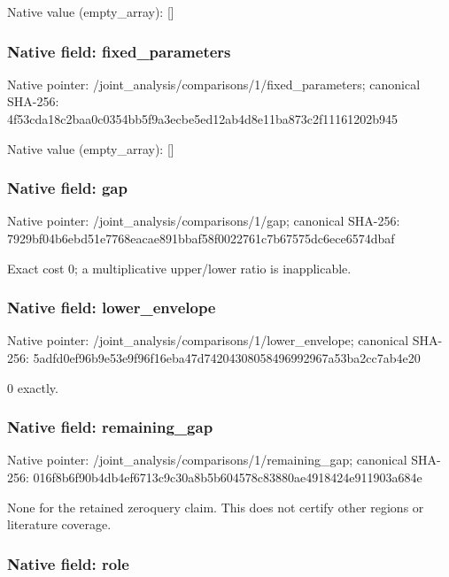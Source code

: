 \documentclass[10pt,a4paper]{article}
\begin{document}
Native value (empty\_array): []



\subsubsection{Native field: fixed\_parameters}


Native pointer: /joint\_analysis/comparis\allowbreak{}ons/1/fixed\_parameters; canonical SHA-256: 4f53cda18c2baa0c0354bb5f\allowbreak{}9a3ecbe5ed12ab4d8e11ba87\allowbreak{}3c2f11161202b945



Native value (empty\_array): []



\subsubsection{Native field: gap}


Native pointer: /joint\_analysis/comparisons/1/gap; canonical SHA-256: 7929bf04b6ebd51e7768eaca\allowbreak{}e891bbaf58f0022761c7b675\allowbreak{}75dc6ece6574dbaf


Exact cost 0; a multiplicative upper/lower ratio is inapplicable.


\subsubsection{Native field: lower\_envelope}


Native pointer: /joint\_analysis/comparis\allowbreak{}ons/1/lower\_envelope; canonical SHA-256: 5adfd0ef96b9e53e9f96f16e\allowbreak{}ba47d7420430805849699296\allowbreak{}7a53ba2cc7ab4e20


0 exactly.


\subsubsection{Native field: remaining\_gap}


Native pointer: /joint\_analysis/comparis\allowbreak{}ons/1/remaining\_gap; canonical SHA-256: 016f8b6f90b4db4ef6713c9c\allowbreak{}30a8b5b604578c83880ae491\allowbreak{}8424e911903a684e


None for the retained zeroquery claim. This does not certify other regions or literature coverage.


\subsubsection{Native field: role}
\end{document}
